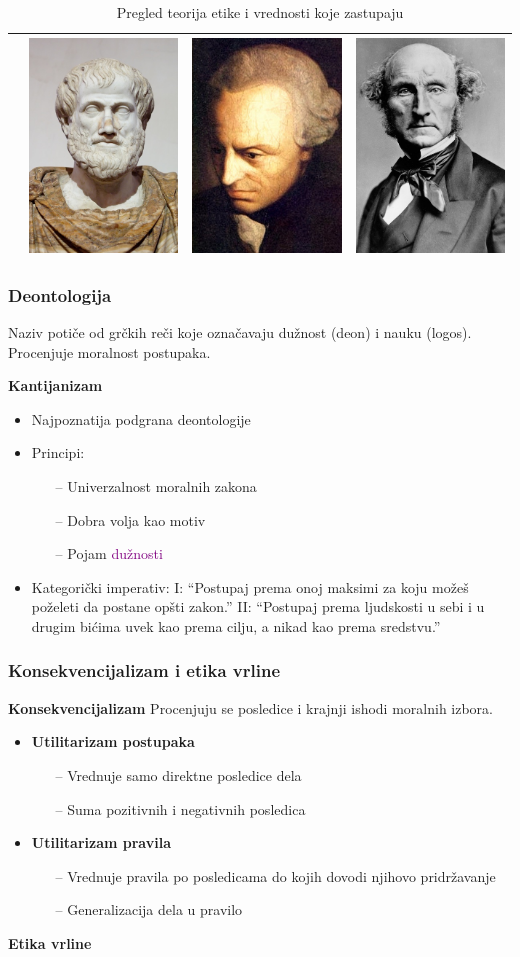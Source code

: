 \documentclass[pdf]{beamer}
\begin{document}
\begin{frame}
\begin{table}
\begin{center}
\begin{tabular}{|l|c|c|c|}
& \includegraphics[scale=.1]{slike/aristotel.jpg} & \includegraphics[scale=.1]{slike/kant.jpg} & \includegraphics[scale=.1]{slike/mil.jpg} \\
\hline
\end{tabular}
\label{tab:tabela1}
\caption{{Pregled teorija etike i vrednosti koje zastupaju}}
\end{center}
\end{table}

\end{frame}

\begin{frame}
\frametitle{Deontologija}

Naziv potiče od grčkih reči koje označavaju dužnost (deon) i nauku (logos). Procenjuje moralnost postupaka.

\textbf{\newline
Kantijanizam}
\begin{itemize}
\item{Najpoznatija podgrana deontologije}
\item{Principi:}
	\begin{itemize}
	\item[--]{Univerzalnost moralnih zakona}
	\item[--]{Dobra volja kao motiv}
	\item[--]{Pojam \textcolor{purple}{dužnosti}} 
	\end{itemize}
\item{Kategorički imperativ:\newline
I: ``Postupaj prema onoj maksimi za koju možeš poželeti da postane opšti zakon.''\newline
II: ``Postupaj prema ljudskosti u sebi i u drugim bićima uvek kao prema cilju, a nikad kao prema sredstvu.''}
\end{itemize} 

\end{frame}
\begin{frame}
\frametitle{Konsekvencijalizam i etika vrline}

\textbf{Konsekvencijalizam}\newline
Procenjuju se posledice i krajnji ishodi moralnih izbora.
\begin{itemize}
\item{\textbf{Utilitarizam postupaka}}
	\begin{itemize}
	\item[--]{Vrednuje samo direktne posledice dela}
	\item[--]{Suma pozitivnih i negativnih posledica}
	\end{itemize}
\item{\textbf{Utilitarizam pravila}}
	\begin{itemize}
	\item[--]{Vrednuje pravila po posledicama do kojih dovodi njihovo pridržavanje}
	\item[--]{Generalizacija dela u pravilo}
	\end{itemize}
\end{itemize}

\textbf{Etika vrline}
\begin{itemize}
\item{Pojmovi ključni za moralan život - edukacija, mudrost, društvene veze, uloga emocija...}
\item{Pojam \textcolo
\end{itemize}
\end{frame}
\end{document}
